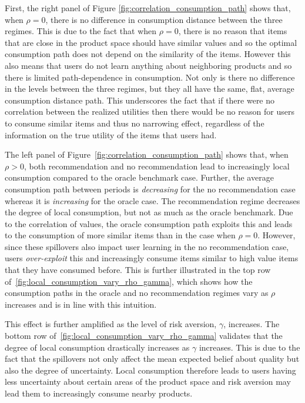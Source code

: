 \documentclass[manuscript]{acmart}
\begin{document}
First, the right panel of Figure \ref{fig:correlation_consumption_path} shows that, when $\rho = 0$, there is no difference in consumption distance between the three regimes. This is due to the fact that when $\rho = 0$, there is no reason that items that are close in the product space should have similar values and so the optimal consumption path does not depend on the similarity of the items. However this also means that users do not learn anything about neighboring products and so there is limited path-dependence in consumption. Not only is there no difference in the levels between the three regimes, but they all have the same, flat, average consumption distance path. This underscores the fact that if there were no correlation between the realized utilities then there would be no reason for users to consume similar items and thus no narrowing effect, regardless of the information on the true utility of the items that users had.
\par
The left panel of Figure~\ref{fig:correlation_consumption_path} shows that, when $\rho > 0$, both recommendation and no recommendation lead to increasingly local consumption compared to the oracle benchmark case. Further, the average consumption path between periods is \textit{decreasing} for the no recommendation case whereas it is \textit{increasing} for the oracle case. The recommendation regime decreases the degree of local consumption, but not as much as the oracle benchmark. Due to the correlation of values, the oracle consumption path exploits this and leads to the consumption of more similar items than in the case when $\rho = 0$. However, since these spillovers also impact user learning in the no recommendation case, users \textit{over-exploit} this and increasingly consume items similar to high value items that they have consumed before. This is further illustrated in the top row of~\autoref{fig:local_consumption_vary_rho_gamma}, which shows how the consumption paths in the oracle and no recommendation regimes vary as $\rho$ increases and is in line with this intuition.
\par
This effect is further amplified as the level of risk aversion, $\gamma$, increases. The bottom row of~\autoref{fig:local_consumption_vary_rho_gamma} validates that the degree of local consumption drastically increases as $\gamma$ increases. This is due to the fact that the spillovers not only affect the mean expected belief about quality but also the degree of uncertainty. Local consumption therefore leads to users having less uncertainty about certain areas of the product space and risk aversion may lead them to increasingly consume nearby products.
\end{document}
